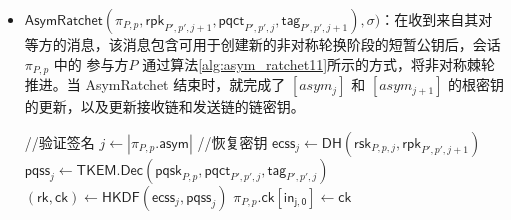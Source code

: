 \begin{definition}[多阶段密钥交换协议]
\begin{itemize}
  \item $\mathsf{AsymRatchet}(\pi_{P,p}, \mathsf{rpk}_{P',p',j+1}, \mathsf{pqct}_{P',p',j}, \mathsf{tag}_{P',p',j+1}), \sigma) $：在收到来自其对等方的消息，该消息包含可用于创建新的非对称轮换阶段的短暂公钥后，会话 $\pi_{P,p}$ 中的 参与方$P$ 通过算法\ref{alg:asym_ratchet11}所示的方式，将非对称棘轮推进。当 AsymRatchet 结束时，就完成了 $[asym_j]$ 和 $[asym_{j+1}]$ 的根密钥的更新，以及更新接收链和发送链的链密钥。
    \begin{algorithm}[H]
    \caption{$\mathsf{AsymRatchet}(\pi_{P,p},\mathsf{rpk}_{P',p',j+1}, \mathsf{pqct}_{P',p',j}, \mathsf{tag}_{P',p',j+1}), \sigma$}
    \label{alg:asym_ratchet11}
    \begin{algorithmic}[1]
        \State //验证签名
        \State $j \gets |\pi_{P,p}.\mathsf{asym}|$ 
        \State //恢复密钥
        \State $\mathsf{ecss}_j \gets \mathsf{DH}(\mathsf{rsk}_{P,p,j}, \mathsf{rpk}_{P',p',j+1})$
        \State $\mathsf{pqss}_j \gets \mathsf{TKEM}.\mathsf{Dec}(\mathsf{pqsk}_{P,p}, \mathsf{pqct}_{P',p',j}, \mathsf{tag}_{P',p',j})$
        \State $(\mathsf{rk}, \mathsf{ck}) \gets \mathsf{HKDF}(\mathsf{ecss}_j, \mathsf{pqss}_j)$
        \State $\pi_{P,p}.\mathsf{ck}[\mathsf{in_{j, 0}}] \gets \mathsf{ck}$ 
        

\end{algorithmic}
\end{algorithm}
\end{itemize}
\end{definition}
